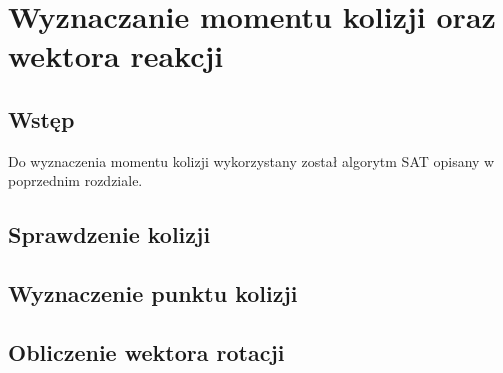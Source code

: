 \chapter{Wyznaczanie momentu kolizji oraz wektora reakcji}

\section{Wstęp}
Do wyznaczenia momentu kolizji wykorzystany został algorytm SAT opisany w poprzednim rozdziale.

\section{Sprawdzenie kolizji}

\section{Wyznaczenie punktu kolizji}

\section{Obliczenie wektora rotacji}